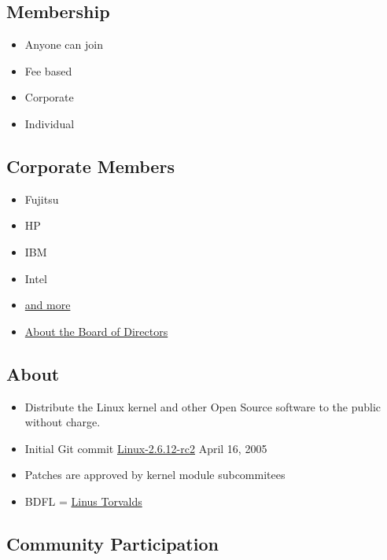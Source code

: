 \subsection{Membership}\label{membership}

\begin{itemize}
\itemsep1pt\parskip0pt
\item
  Anyone can join
\item
  Fee based
\item
  Corporate
\item
  Individual
\end{itemize}

\subsection{Corporate Members}\label{corporate-members}

\begin{itemize}
\itemsep1pt\parskip0pt
\item
  Fujitsu
\item
  HP
\item
  IBM
\item
  Intel
\item
  \href{http://www.linuxfoundation.org/about/members}{and more}
\item
  \href{http://www.linuxfoundation.org/about/board-members}{About the
  Board of Directors}
\end{itemize}

\subsection{About}\label{about}

\begin{itemize}
\itemsep1pt\parskip0pt
\item
  Distribute the Linux kernel and other Open Source software to the
  public without charge.
\item
  Initial Git commit
  \href{https://github.com/torvalds/linux/commit/1da177e4c3f41524e886b7f1b8a0c1fc7321cac2}{Linux-2.6.12-rc2}
  April 16, 2005
\item
  Patches are approved by kernel module subcommitees
\item
  BDFL = \href{http://en.wikipedia.org/wiki/Linus_Torvalds}{Linus
  Torvalds}
\end{itemize}

\subsection{Community Participation}\label{community-participation}

